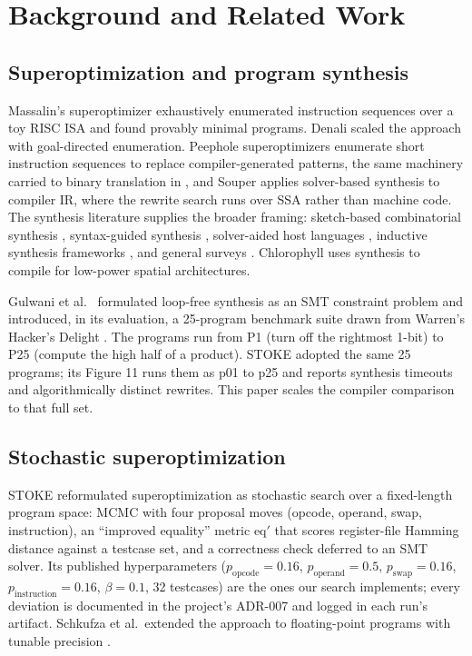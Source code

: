 \documentclass[journal,10pt]{IEEEtran}
\begin{document}
\section{Background and Related Work}
\label{sec:background}

\subsection{Superoptimization and program synthesis}
Massalin's superoptimizer \cite{massalin87} exhaustively enumerated
instruction sequences over a toy RISC ISA and found provably minimal
programs. Denali \cite{denali02} scaled the approach with goal-directed
enumeration. Peephole superoptimizers \cite{bansal06} enumerate short
instruction sequences to replace compiler-generated patterns, the same
machinery carried to binary translation in \cite{bansal08}, and Souper
\cite{souper} applies solver-based synthesis to compiler IR, where the
rewrite search runs over SSA rather than machine code. The synthesis
literature supplies the broader framing: sketch-based combinatorial
synthesis \cite{sketch06}, syntax-guided synthesis \cite{sygus13},
solver-aided host languages \cite{rosette14}, inductive synthesis
frameworks \cite{flashmeta15}, and general surveys
\cite{gulwani-survey17}. Chlorophyll \cite{chlorophyll14} uses
synthesis to compile for low-power spatial architectures.

Gulwani et al.\ \cite{gulwani11} formulated loop-free synthesis as an
SMT constraint problem and introduced, in its evaluation, a 25-program
benchmark suite drawn from Warren's Hacker's Delight \cite{warren13}.
The programs run from P1 (turn off the rightmost 1-bit) to P25
(compute the high half of a product). STOKE \cite{stoke13} adopted the
same 25 programs; its Figure 11 runs them as p01 to p25 and reports
synthesis timeouts and algorithmically distinct rewrites. This paper
scales the compiler comparison to that full set.

\subsection{Stochastic superoptimization}
STOKE \cite{stoke13} reformulated superoptimization as stochastic
search over a fixed-length program space: MCMC with four proposal
moves (opcode, operand, swap, instruction), an ``improved equality''
metric $\mathrm{eq}'$ that scores register-file Hamming distance
against a testcase set, and a correctness check deferred to an SMT
solver. Its published hyperparameters ($p_{\mathrm{opcode}}=0.16$,
$p_{\mathrm{operand}}=0.5$, $p_{\mathrm{swap}}=0.16$,
$p_{\mathrm{instruction}}=0.16$, $\beta=0.1$, 32 testcases) are the
ones our search implements; every deviation is documented in the
project's ADR-007 and logged in each run's artifact. Schkufza et al.\
extended the approach to floating-point programs with tunable
precision \cite{stokefp14}.
\end{document}
